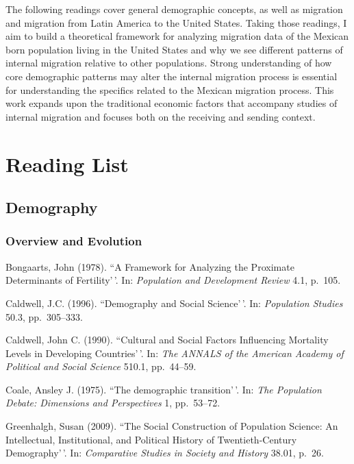 \documentclass[11pt,]{article}
\begin{document}
The following readings cover general demographic concepts, as well as
migration and migration from Latin America to the United States. Taking
those readings, I aim to build a theoretical framework for analyzing
migration data of the Mexican born population living in the United
States and why we see different patterns of internal migration relative
to other populations. Strong understanding of how core demographic
patterns may alter the internal migration process is essential for
understanding the specifics related to the Mexican migration process.
This work expands upon the traditional economic factors that accompany
studies of internal migration and focuses both on the receiving and
sending context.

\hypertarget{reading-list}{%
\section{Reading List}\label{reading-list}}

\hypertarget{demography}{%
\subsection{Demography}\label{demography}}

\hypertarget{overview-and-evolution}{%
\subsubsection{Overview and Evolution}\label{overview-and-evolution}}

Bongaarts, John (1978). ``A Framework for Analyzing the Proximate
Determinants of Fertility'\,'. In:
\emph{Population and Development Review} 4.1, p.~105.

Caldwell, J.C. (1996). ``Demography and Social Science'\,'. In:
\emph{Population Studies} 50.3, pp.~305--333.

Caldwell, John C. (1990). ``Cultural and Social Factors Influencing
Mortality Levels in Developing Countries'\,'. In:
\emph{The ANNALS of the American Academy of Political and Social Science}
510.1, pp.~44--59.

Coale, Ansley J. (1975). ``The demographic transition'\,'. In:
\emph{The Population Debate: Dimensions and Perspectives} 1, pp.~53--72.

Greenhalgh, Susan (2009). ``The Social Construction of Population
Science: An Intellectual, Institutional, and Political History of
Twentieth-Century Demography'\,'. In:
\emph{Comparative Studies in Society and History} 38.01, p.~26.
\end{document}
